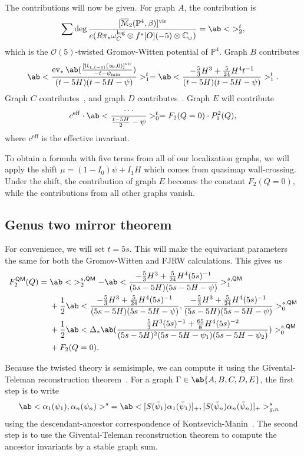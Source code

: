 \documentclass[10pt]{amsart}
\theoremstyle{definition}
\theoremstyle{remark}
\theoremstyle{plain}
\theoremstyle{definition}
\theoremstyle{remark}
\newcommand{\C}{\mathbb{C}}
\renewcommand{\P}{\mathbb{P}}
\newcommand{\Mbar}{\overline{\mathcal{M}}}
\newcommand{\mc}[1]{\mathcal{#1}}
\newcommand{\mr}[1]{\mathrm{#1}}
\newcommand{\ms}[1]{\mathsf{#1}}
\newcommand{\1}{\mathbf{1}}
\newcommand{\2}{\mathbf{2}}
\newcommand{\3}{\mathbf{3}}
\newcommand{\vir}{\mr{vir}}
\newcommand{\QM}{\ms{QM}}
\DeclareMathOperator{\ev}{ev}
\begin{document}
The contributions will now be given. For graph $A$, the contribution is
\begin{align*}
    \sum \deg \frac{[\Mbar_2(\P^4, \beta)]^{\vir}}{e(R\pi_* \omega_C^{\log} \otimes f^* \mc[O](-5) \otimes \C_{\omega})} = \ab<\ >_2^t,
\end{align*}
which is the $\mc{O}(5)$-twisted Gromov-Witten potential of $\P^4$. Graph $B$ contributes
\[ \ab<\frac{\ev_* \ab(\frac{[\mc{U}_{1,(-1)}(\infty,0)]^{\vir}}{-t-\psi_{\min}})}{(t-5H)(t-5H-\psi)}>_1^{t} =  \ab< \frac{-\frac{5}{3}H^3 + \frac{5}{24}H^4t^{-1}}{(t-5H)(t-5H-\psi)}>_1^{t}. \]
Graph $C$ contributes~, and graph $D$ contributes~. Graph $E$ will contribute
\[ c^{\mr{eff}} \cdot \ab<\frac{\cdots}{\frac{t-5H}{2}-\psi}>_0^{t} = F_2(Q=0) \cdot P_1^2(Q), \]
where $c^{\mr{eff}}$ is the effective invariant.


To obtain a formula with five terms from all of our localization graphs, we will apply the shift $\mu = (1-I_0)\psi + I_1 H$ which comes from quasimap wall-crossing. Under the shift, the contribution of graph $E$ becomes the constant $F_2(Q=0)$, while the contributions from all other graphs vanish.

\subsection{Genus two mirror theorem}%
\label{sub:Genus two mirror theorem}

For convenience, we will set $t = 5s$. This will make the equivariant parameters the same for both the Gromov-Witten and FJRW calculations. This gives us
\begin{align*}
    F_2^{\QM}(Q) ={}& \ab<\ >_2^{s,\QM} - \ab< \frac{-\frac{5}{3}H^3 + \frac{5}{24}H^4(5s)^{-1}}{(5s-5H)(5s-5H-\psi)}>_1^{s,\QM} \\
    &+ \frac{1}{2} \ab<\frac{-\frac{5}{3}H^3 + \frac{5}{24}H^4 (5s)^{-1}}{(5s-5H)(5s-5H-\psi)}, \frac{-\frac{5}{3}H^3 + \frac{5}{24}H^4 (5s)^{-1}}{(5s-5H)(5s-5H-\psi)}>_0^{s,\QM}  \\
    &+ \frac{1}{2} \ab<\Delta_* \ab(\frac{\frac{5}{3} H^3 (5s)^{-1}+ \frac{65}{8}H^4 (5s)^{-2}}{(5s-5H)^2(5s-5H-\psi_1)(5s-5H-\psi_2)})>_0^{s,\QM}  \\
    &+ F_2(Q=0).
\end{align*}

Because the twisted theory is semisimple, we can compute it using the Givental-Teleman reconstruction theorem~\cite{ssfrobhg,2dsscohft}. For a graph $\Gamma \in \ab\{A,B,C,D,E\}$, the first step is to write
\begin{align*}
    \ab<\alpha_1(\psi_1), \alpha_n(\psi_n)>^s &= \ab<[ S(\bar{\psi}_1)\alpha_1(\bar{\psi}_1 )]_+, [S(\bar{\psi}_n) \alpha_n(\bar{\psi}_n)]_+>_{g,n}^s
\end{align*}
using the descendant-ancestor correspondence of Kontsevich-Manin~\cite{descancestor}.
The second step is to use the Givental-Teleman reconstruction theorem to compute the ancestor invariants by a stable graph sum.
\end{document}
